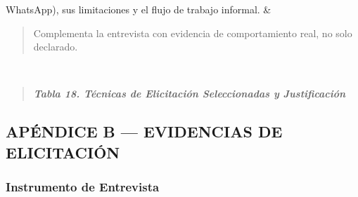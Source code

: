 \documentclass[
]{article}
\begin{document}
{\begin{longtable}[]
WhatsApp), sus limitaciones y el flujo de trabajo informal. &
\begin{minipage}[t]{\linewidth}\raggedright
\begin{quote}
Complementa la entrevista con evidencia de comportamiento real, no solo
declarado.
\end{quote}
\end{minipage} \\
\end{longtable}
}

\begin{quote}
\protect{}\label{_bookmark74}{}\emph{\textbf{Tabla 18.
Técnicas de Elicitación Seleccionadas y Justificación}}
\end{quote}

\subsection{APÉNDICE B --- EVIDENCIAS DE
ELICITACIÓN}\label{apuxe9ndice-b-evidencias-de-elicitaciuxf3n}

\subsubsection{Instrumento de
Entrevista}\label{instrumento-de-entrevista}
\end{document}
